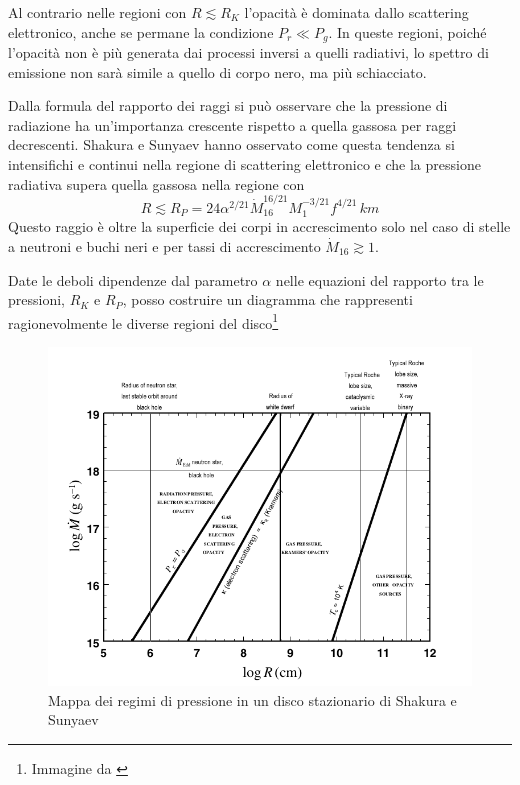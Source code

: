 \documentclass[a4paperbi]{article}
\begin{document}
	Al contrario nelle regioni con $R\lesssim R_K$ l'opacità è dominata dallo scattering elettronico, anche se permane la condizione $P_r\ll P_g$. In queste regioni, poiché l'opacità non è più generata dai processi inversi a quelli radiativi, lo spettro di emissione non sarà simile a quello di corpo nero, ma più schiacciato.
	
	Dalla formula del rapporto dei raggi si può osservare che la pressione di radiazione ha un'importanza crescente rispetto a quella gassosa per raggi decrescenti. Shakura e Sunyaev hanno osservato come questa tendenza si intensifichi e continui nella regione di scattering elettronico e che la pressione radiativa supera quella gassosa nella regione con
	\begin{equation}
		R\lesssim R_P=24\alpha^{2/21}\dot{M}^{16/21}_{16}M^{-3/21}_1f^{4/21}\,km
	\end{equation}
	Questo raggio è oltre la superficie dei corpi in accrescimento solo nel caso di stelle a neutroni e buchi neri e per tassi di accrescimento $\dot{M}_{16}\gtrsim 1$.
	
	Date le deboli dipendenze dal parametro $\alpha$ nelle equazioni del rapporto tra le pressioni, $R_K$ e $R_P$, posso costruire un diagramma che rappresenti ragionevolmente le diverse regioni del disco\footnote{Immagine da \cite{FrankKingRaineAccretionPower}}
	
	\begin{figure}[H]
		\centering
		\includegraphics[width=1\linewidth]{MappaPressione}
		\caption{Mappa dei regimi di pressione in un disco stazionario di Shakura e Sunyaev}
		\label{fig:MappaPressione}
	\end{figure}
	
\end{document}
